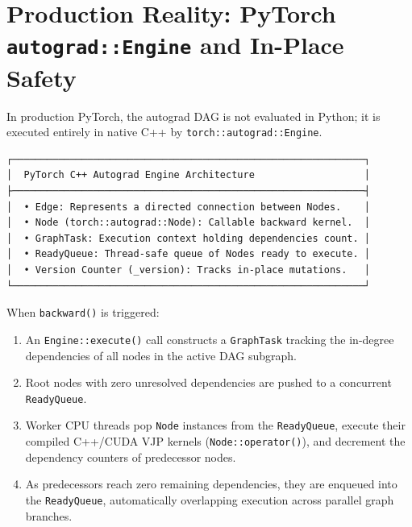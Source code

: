 \documentclass[
  letterpaper,
]{scrbook}
\providecommand{\tightlist}{%
  \setlength{\itemsep}{0pt}\setlength{\parskip}{0pt}}
\begin{document}

\section{\texorpdfstring{Production Reality: PyTorch
\texttt{autograd::Engine} and In-Place
Safety}{Production Reality: PyTorch autograd::Engine and In-Place Safety}}\label{production-reality-pytorch-autogradengine-and-in-place-safety}

In production PyTorch, the autograd DAG is not evaluated in Python; it
is executed entirely in native C++ by \texttt{torch::autograd::Engine}.

\begin{verbatim}
┌─────────────────────────────────────────────────────────────┐
│  PyTorch C++ Autograd Engine Architecture                   │
├─────────────────────────────────────────────────────────────┤
│  • Edge: Represents a directed connection between Nodes.    │
│  • Node (torch::autograd::Node): Callable backward kernel.  │
│  • GraphTask: Execution context holding dependencies count. │
│  • ReadyQueue: Thread-safe queue of Nodes ready to execute. │
│  • Version Counter (_version): Tracks in-place mutations.   │
└─────────────────────────────────────────────────────────────┘
\end{verbatim}

When \texttt{backward()} is triggered:

\begin{enumerate}
\def\labelenumi{\arabic{enumi}.}
\tightlist
\item
  An \texttt{Engine::execute()} call constructs a \texttt{GraphTask}
  tracking the in-degree dependencies of all nodes in the active DAG
  subgraph.
\item
  Root nodes with zero unresolved dependencies are pushed to a
  concurrent \texttt{ReadyQueue}.
\item
  Worker CPU threads pop \texttt{Node} instances from the
  \texttt{ReadyQueue}, execute their compiled C++/CUDA VJP kernels
  (\texttt{Node::operator()}), and decrement the dependency counters of
  predecessor nodes.
\item
  As predecessors reach zero remaining dependencies, they are enqueued
  into the \texttt{ReadyQueue}, automatically overlapping execution
  across parallel graph branches.
\end{enumerate}
\end{document}
